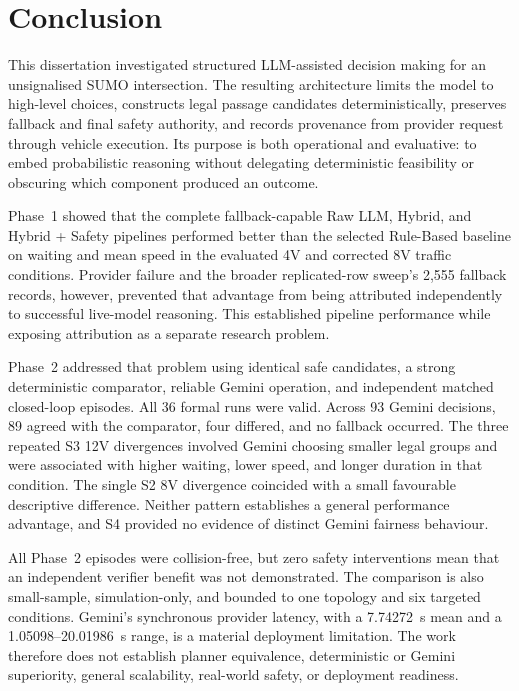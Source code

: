 \documentclass[letterpaper,10pt,conference]{ieeeconf}
\begin{document}
\section{Conclusion}



This dissertation investigated structured LLM-assisted decision making for an unsignalised SUMO intersection. The resulting architecture limits the model to high-level choices, constructs legal passage candidates deterministically, preserves fallback and final safety authority, and records provenance from provider request through vehicle execution. Its purpose is both operational and evaluative: to embed probabilistic reasoning without delegating deterministic feasibility or obscuring which component produced an outcome.



Phase~1 showed that the complete fallback-capable Raw LLM, Hybrid, and Hybrid + Safety pipelines performed better than the selected Rule-Based baseline on waiting and mean speed in the evaluated 4V and corrected 8V traffic conditions. Provider failure and the broader replicated-row sweep's 2,555 fallback records, however, prevented that advantage from being attributed independently to successful live-model reasoning. This established pipeline performance while exposing attribution as a separate research problem.



Phase~2 addressed that problem using identical safe candidates, a strong deterministic comparator, reliable Gemini operation, and independent matched closed-loop episodes. All 36 formal runs were valid. Across 93 Gemini decisions, 89 agreed with the comparator, four differed, and no fallback occurred. The three repeated S3 12V divergences involved Gemini choosing smaller legal groups and were associated with higher waiting, lower speed, and longer duration in that condition. The single S2 8V divergence coincided with a small favourable descriptive difference. Neither pattern establishes a general performance advantage, and S4 provided no evidence of distinct Gemini fairness behaviour.



All Phase~2 episodes were collision-free, but zero safety interventions mean that an independent verifier benefit was not demonstrated. The comparison is also small-sample, simulation-only, and bounded to one topology and six targeted conditions. Gemini's synchronous provider latency, with a 7.74272~s mean and a 1.05098--20.01986~s range, is a material deployment limitation. The work therefore does not establish planner equivalence, deterministic or Gemini superiority, general scalability, real-world safety, or deployment readiness.
\end{document}

